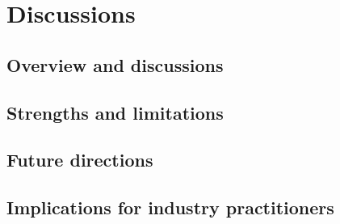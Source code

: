 \chapter{Discussions}\label{chap:chapter7}

\section{Overview and discussions}

\section{Strengths and limitations}

\section{Future directions}

\section{Implications for industry practitioners}